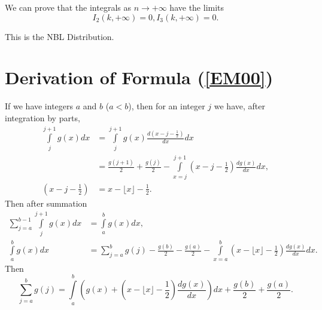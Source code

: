 \documentclass[titlepage,fleqn]{article}%
\begin{document}
We can prove that the integrals as $n\rightarrow+\infty$ have the limits%
\[
I_{2}(k,+\infty)=0,I_{3}(k,+\infty)=0.
\]


This is the NBL Distribution.

\section{Derivation of Formula (\ref{EM00})}

\bigskip%
\label{DerForm}%


If we have integers $a$ and $b$ ($a<b$), then for an integer $j$ we have,
after integration by parts,
\begin{align*}%
{\displaystyle\int\limits_{j}^{j+1}}
g(x)dx  &  =%
{\displaystyle\int\limits_{j}^{j+1}}
g(x)\frac{d\left(  x-j-\frac{1}{2}\right)  }{dx}dx\\
&  =\frac{g(j+1)}{2}+\frac{g(j)}{2}-%
{\displaystyle\int\limits_{x=j}^{j+1}}
\left(  x-j-\frac{1}{2}\right)  \frac{dg(x)}{dx}dx,\\
\left(  x-j-\frac{1}{2}\right)   &  =x-\lfloor x\rfloor-\frac{1}{2}.
\end{align*}
Then after summation%
\begin{align*}%
{\displaystyle\sum\limits_{j=a}^{b-1}}
{\displaystyle\int\limits_{j}^{j+1}}
g(x)dx  &  =%
{\displaystyle\int\limits_{a}^{b}}
g(x)dx,\\%
{\displaystyle\int\limits_{a}^{b}}
g(x)dx  &  =%
{\displaystyle\sum\limits_{j=a}^{b}}
g(j)-\frac{g(b)}{2}-\frac{g(a)}{2}-%
{\displaystyle\int\limits_{x=a}^{b}}
\left(  x-\lfloor x\rfloor-\frac{1}{2}\right)  \frac{dg(x)}{dx}dx.
\end{align*}
Then%
\[%
{\displaystyle\sum\limits_{j=a}^{b}}
g(j)=%
{\displaystyle\int\limits_{a}^{b}}
\left(  g(x)+\left(  x-\lfloor x\rfloor-\frac{1}{2}\right)  \frac{dg(x)}%
{dx}\right)  dx+\frac{g(b)}{2}+\frac{g(a)}{2}.
\]
\end{document}
